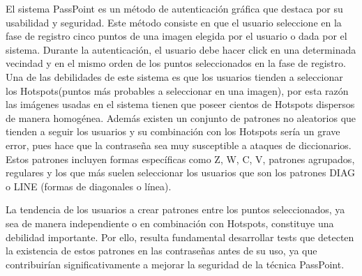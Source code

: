 \documentclass[12pt]{report}
\begin{document}
	El sistema PassPoint\cite{1} es un método de autenticación gráfica que destaca por su usabilidad y seguridad. Este método consiste  en que el usuario seleccione en la fase de registro  cinco puntos de una imagen elegida por el usuario o dada por el sistema. Durante la autenticación, el usuario debe hacer click en una determinada vecindad y en el mismo orden de los puntos seleccionados en la fase de  registro. Una de las debilidades de este sistema es que los usuarios tienden a seleccionar los Hotspots\cite{4}(puntos más probables a seleccionar en una imagen), por esta razón las imágenes usadas en el sistema tienen que poseer cientos de Hotspots dispersos de manera homogénea. Además existen un conjunto de patrones no aleatorios que tienden a seguir los usuarios y su combinación con los Hotspots sería un grave error, pues hace que la contraseña sea muy susceptible a ataques de diccionarios. Estos patrones incluyen formas específicas como Z, W, C, V, patrones agrupados, regulares y los que más suelen seleccionar los usuarios  que son los  patrones DIAG o LINE (formas de diagonales o línea)\cite{5}.
	
	
	La tendencia de los usuarios a crear patrones entre los puntos seleccionados, ya sea de manera independiente o en combinación con Hotspots, constituye una debilidad importante. Por ello, resulta fundamental desarrollar tests que detecten la existencia de estos patrones en las contraseñas antes de su uso, ya que contribuirían significativamente a mejorar la seguridad de la técnica PassPoint.
	
	
\end{document}
